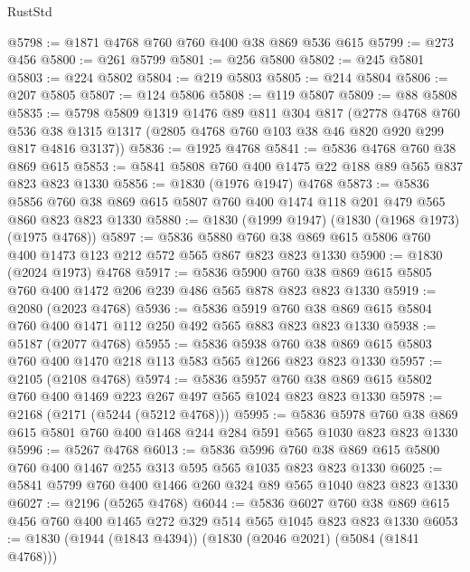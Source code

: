 \begin{lexlean}{RustStd}
\begin{coremodule}
@5798 := @1871 @4768 @760 @760 @400 @38 @869 @536 @615
@5799 := @273 @456
@5800 := @261 @5799
@5801 := @256 @5800
@5802 := @245 @5801
@5803 := @224 @5802
@5804 := @219 @5803
@5805 := @214 @5804
@5806 := @207 @5805
@5807 := @124 @5806
@5808 := @119 @5807
@5809 := @88 @5808
@5835 := @5798
    @5809
    @1319
    @1476
    @89
    @811
    @304
    @817
    (@2778
      @4768
      @760
      @536
      @38
      @1315
      @1317
      (@2805 @4768 @760 @103 @38 @46 @820 @920 @299 @817 @4816 @3137))
@5836 := @1925 @4768
@5841 := @5836 @4768 @760 @38 @869 @615
@5853 := @5841 @5808 @760 @400 @1475 @22 @188 @89 @565 @837 @823 @823 @1330
@5856 := @1830 (@1976 @1947) @4768
@5873 := @5836
    @5856
    @760
    @38
    @869
    @615
    @5807
    @760
    @400
    @1474
    @118
    @201
    @479
    @565
    @860
    @823
    @823
    @1330
@5880 := @1830 (@1999 @1947) (@1830 (@1968 @1973) (@1975 @4768))
@5897 := @5836
    @5880
    @760
    @38
    @869
    @615
    @5806
    @760
    @400
    @1473
    @123
    @212
    @572
    @565
    @867
    @823
    @823
    @1330
@5900 := @1830 (@2024 @1973) @4768
@5917 := @5836
    @5900
    @760
    @38
    @869
    @615
    @5805
    @760
    @400
    @1472
    @206
    @239
    @486
    @565
    @878
    @823
    @823
    @1330
@5919 := @2080 (@2023 @4768)
@5936 := @5836
    @5919
    @760
    @38
    @869
    @615
    @5804
    @760
    @400
    @1471
    @112
    @250
    @492
    @565
    @883
    @823
    @823
    @1330
@5938 := @5187 (@2077 @4768)
@5955 := @5836
    @5938
    @760
    @38
    @869
    @615
    @5803
    @760
    @400
    @1470
    @218
    @113
    @583
    @565
    @1266
    @823
    @823
    @1330
@5957 := @2105 (@2108 @4768)
@5974 := @5836
    @5957
    @760
    @38
    @869
    @615
    @5802
    @760
    @400
    @1469
    @223
    @267
    @497
    @565
    @1024
    @823
    @823
    @1330
@5978 := @2168 (@2171 (@5244 (@5212 @4768)))
@5995 := @5836
    @5978
    @760
    @38
    @869
    @615
    @5801
    @760
    @400
    @1468
    @244
    @284
    @591
    @565
    @1030
    @823
    @823
    @1330
@5996 := @5267 @4768
@6013 := @5836
    @5996
    @760
    @38
    @869
    @615
    @5800
    @760
    @400
    @1467
    @255
    @313
    @595
    @565
    @1035
    @823
    @823
    @1330
@6025 := @5841 @5799 @760 @400 @1466 @260 @324 @89 @565 @1040 @823 @823 @1330
@6027 := @2196 (@5265 @4768)
@6044 := @5836
    @6027
    @760
    @38
    @869
    @615
    @456
    @760
    @400
    @1465
    @272
    @329
    @514
    @565
    @1045
    @823
    @823
    @1330
@6053 := @1830 (@1944 (@1843 @4394)) (@1830 (@2046 @2021) (@5084 (@1841 @4768)))

\end{coremodule}
\end{lexlean}
